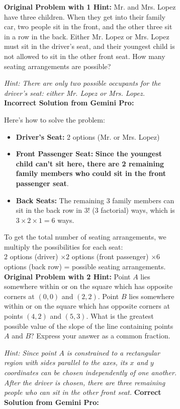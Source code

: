 \begin{figure}[h]
\begin{subfigure}{\linewidth}
\begin{tcolorbox}[colback=blue!5!white,colframe=mybrown!75!black]
\begin{small}
\textbf{Original Problem with 1 Hint:}
Mr. and Mrs. Lopez have three children.  When they get into their family car, two people sit in the front, and the other three sit in a row in the back.  Either Mr. Lopez or Mrs. Lopez must sit in the driver's seat, and their youngest child is not allowed to sit in the other front seat.  How many seating arrangements are possible?

\textit{Hint: There are only two possible occupants for the driver's seat: either Mr. Lopez or Mrs. Lopez.}
\Sepline
\textbf{Incorrect Solution from Gemini Pro:}

Here's how to solve the problem:
\begin{itemize}
    \item \textbf{Driver's Seat:} 2 options (Mr. or Mrs. Lopez)
    \item \textbf{Front Passenger Seat:} \textbf{\textcolor{mistake}{Since the youngest child can't sit here, there are 2 remaining family members who could sit in the front passenger seat}}.
    \item \textbf{Back Seats:} The remaining 3 family members can sit in the back row in $3!$ (3 factorial) ways, which is $3 \times 2 \times 1 = 6$ ways.
\end{itemize}
To get the total number of seating arrangements, we multiply the possibilities for each seat: \\
$2$ options (driver) $\times 2$ options (front passenger) $\times 6$ options (back row) = \textcolor{mistake}{} possible seating arrangements.
\Sepline
\textbf{Original Problem with 2 Hint:}
Point $A$ lies somewhere within or on the square which has opposite corners at $(0,0)$ and $(2,2)$. Point $B$ lies somewhere within or on the square which has opposite corners at points $(4,2)$ and $(5,3)$. What is the greatest possible value of the slope of the line containing points $A$ and $B$? Express your answer as a common fraction.

\textit{Hint: Since point $A$ is constrained to a rectangular region with sides parallel to the axes, its $x$ and $y$ coordinates can be chosen independently of one another. After the driver is chosen, there are three remaining people who can sit in the other front seat.}
\Sepline
\textbf{Correct Solution from Gemini Pro:}


\end{small}
\end{tcolorbox}
\end{subfigure}
\end{figure}
